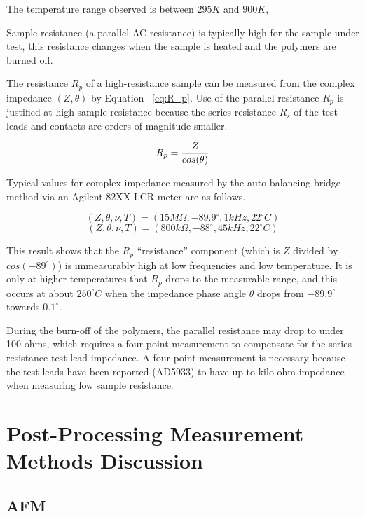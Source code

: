 \documentclass[12pt,oneside,english]{article}
\begin{document}
	The temperature range observed is between $295K$ and $900K$, 
	
	Sample resistance (a parallel AC resistance) is typically high for the sample under test, this resistance changes when the sample is heated and the polymers are burned off.  

	The resistance $R_p$ of a high-resistance sample can be measured from the complex impedance $(Z,\theta)$ by Equation ~\ref{eq:R_p}.  Use of the parallel resistance $R_p$ is justified at high sample resistance because the series resistance $R_s$ of the test leads and contacts are orders of magnitude smaller.
	
	\begin{equation}
		R_p = {{Z} \over {cos({\theta})}}
		\label{eq:R_p}
	\end{equation}
	
	Typical values for complex impedance measured by the auto-balancing bridge method via an Agilent 82XX LCR meter are as follows.
	
	\begin{equation}
		\left( Z,\theta,\nu,T \right) = \left( 15 M\Omega, -89.9^\circ, 1kHz, 22^{\circ}C \right)
	\end{equation}
	\begin{equation}
		\left( Z, \theta, \nu, T \right) = \left( 800 k\Omega, -88^\circ, 45kHz, 22^{\circ}C \right)
	\end{equation}
	
	This result shows that the $R_p$ ``resistance'' component (which is $Z$ divided by $cos(-89^\circ)$) is immeasurably high at low frequencies and low temperature.  It is only at higher temperatures that $R_p$ drops to the measurable range, and this occurs at about $250^{\circ}C$ when the impedance phase angle $\theta$ drops from $-89.9^\circ$ towards $0.1^\circ$.
	
	During the burn-off of the polymers, the parallel resistance may drop to under 100 ohms, which requires a four-point measurement to compensate for the series resistance test lead impedance.
	A four-point measurement is necessary because the test leads have been reported (AD5933) to have up to kilo-ohm impedance when measuring low sample resistance.


	\section{ Post-Processing Measurement Methods Discussion }
	\subsection{AFM}
\end{document}
